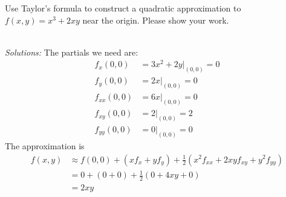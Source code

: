
\ifnum {}
\question[4] Use Taylor's formula to construct a quadratic approximation to $f(x,y) = x^3+2xy$ near the origin. Please show your work. 
\ifnum {} {\color{DarkBlue} \\ \textit{Solutions:} The partials we need are: 
\begin{align*}
    f_x(0,0) &= 3x^2 + 2y\big|_{(0,0)} = 0 \\
    f_y(0,0) &= 2x \big|_{(0,0)} = 0 \\
    f_{xx}(0,0) &= 6x\big|_{(0,0)} = 0 \\
    f_{xy}(0,0) &= 2 \big|_{(0,0)} = 2 \\    
    f_{yy}(0,0) &= 0 \big|_{(0,0)} = 0 
\end{align*}
The approximation is
\begin{align*}
    f(x,y) 
    &\approx f(0,0) + (xf_x + yf_y) + \frac12(x^2f_{xx} + 2xyf_{xy} + y^2f_{yy}) \\ 
    &= 0 + (0+0) + \frac12 (0+4xy+0) \\ 
    &= 2xy
\end{align*}

    } 
   \else
      
   \fi
    
\fi